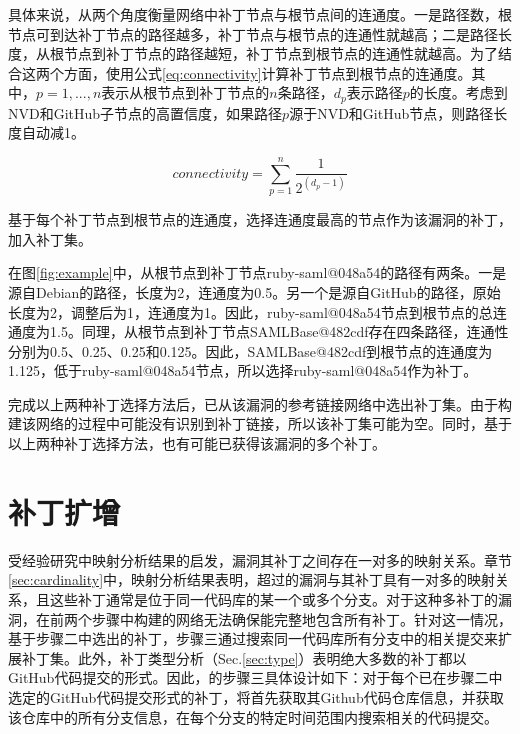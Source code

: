 具体来说，\tool 从两个角度衡量网络中补丁节点与根节点间的连通度。一是路径数，根节点可到达补丁节点的路径越多，补丁节点与根节点的连通性就越高；二是路径长度，从根节点到补丁节点的路径越短，补丁节点到根节点的连通性就越高。为了结合这两个方面，\tool 使用公式\ref{eq:connectivity}计算补丁节点到根节点的连通度。其中，$ p = 1, ..., n$表示从根节点到补丁节点的$n$条路径，$d_p$表示路径$p$的长度。考虑到NVD和GitHub子节点的高置信度，如果路径$p$源于NVD和GitHub节点，则路径长度自动减1。

\begin{equation}\label{eq:connectivity}
    connectivity =\sum_{p=1}^{n}   \frac{1}{2^{({d}_{p} -1)}}
\end{equation}

基于每个补丁节点到根节点的连通度，\tool 选择连通度最高的节点作为该漏洞的补丁，加入补丁集。

\begin{exmp}
在图\ref{fig:example}中，从根节点到补丁节点ruby-saml@048a54的路径有两条。一是源自Debian的路径，长度为2，连通度为0.5。另一个是源自GitHub的路径，原始长度为2，调整后为1，连通度为1。因此，ruby-saml@048a54节点到根节点的总连通度为1.5。同理，从根节点到补丁节点SAMLBase@482cdf存在四条路径，连通性分别为0.5、0.25、0.25和0.125。因此，SAMLBase@482cdf到根节点的连通度为1.125，低于ruby-saml@048a54节点，所以\tool 选择ruby-saml@048a54作为补丁。%
\end{exmp}

完成以上两种补丁选择方法后，\tool 已从该漏洞的参考链接网络中选出补丁集。由于构建该网络的过程中可能没有识别到补丁链接，所以该补丁集可能为空。同时，基于以上两种补丁选择方法，\tool 也有可能已获得该漏洞的多个补丁。


\section{补丁扩增}
受经验研究中映射分析结果的启发，漏洞其补丁之间存在一对多的映射关系。章节\ref{sec:cardinality}中，映射分析结果表明，超过的漏洞与其补丁具有一对多的映射关系，且这些补丁通常是位于同一代码库的某一个或多个分支。对于这种多补丁的漏洞，\tool 在前两个步骤中构建的网络无法确保能完整地包含所有补丁。针对这一情况，基于步骤二中选出的补丁，步骤三通过搜索同一代码库所有分支中的相关提交来扩展补丁集。此外，补丁类型分析（Sec.\ref{sec:type}）表明绝大多数的补丁都以GitHub代码提交的形式。因此，\tool 的步骤三具体设计如下：对于每个已在步骤二中选定的GitHub代码提交形式的补丁，\tool 将首先获取其Github代码仓库信息，并获取该仓库中的所有分支信息，在每个分支的特定时间范围内搜索相关的代码提交。

